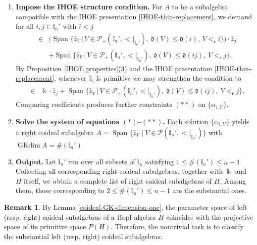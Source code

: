 \documentclass{article}
\theoremstyle{plain}
\theoremstyle{definition}
\newtheorem{remark}[thm]{Remark}
\numberwithin{equation}{section}
\DeclareMathOperator{\Span}{Span}
\DeclareMathOperator{\GKdim}{GKdim}
\newcommand{\PP}{\mathcal{P}}
\newcommand{\II}{\mathbb{I}}
\newcommand{\dd}{\mathfrak{d}}
\newcommand{\rr}{\mathfrak{r}}
\begin{document}
\begin{enumerate}
		\item[4.] \textbf{Impose the IHOE structure condition.}
		For $A$ to be a subalgebra compatible with the IHOE presentation \eqref{IHOE-thin-replacement}, we demand for all $i,j\in\II_{n}'$ with $i< j$
		\begin{eqnarray*}
			[\hat z_{j},\hat z_{i}] & \in & \bigl( \Span\bigl\{\hat z_{V}  \,\big|\, V \in \PP_{+}(\II_{n}',{<}|_{\II_{n}'}),~ \dd(V)\le \dd(i), ~ V<_{\rr }i\bigr\} \bigr) \cdot \hat z_{j}  \\
			&& + \Span\bigl\{\hat z_{V}\,\big|\, V \in \PP_{+}(\II_{n}',{<}|_{\II_{n}'}),~ \dd(V)\le \dd(ij), ~ V<_{\rr }j\bigr\}.
		\end{eqnarray*}
		By Proposition \ref{IHOE properties}(3) and the IHOE presentation \eqref{IHOE-thin-replacement}, whenever $\hat z_{i}$ is primitive we may strengthen the condition to
		\begin{eqnarray*}
			[\hat z_{j},\hat z_{i}] & \in &  \Bbbk \cdot \hat z_{j}  +  \Span\bigl\{\hat z_{V}\,\big|\, V \in \PP_{+}(\II_{n}',{<}|_{\II_{n}'}),~ \dd(V)\le \dd(ij), ~ V<_{\rr }j\bigr\}.
		\end{eqnarray*}
		Comparing coefficients produces further constraints $(\ast\ast)$ on $\{\alpha_{i,U}\}$.
		
		\item[5.] \textbf{Solve the system of equations $(\ast)$--$(\ast\ast)$.}
		Each solution $\{\alpha_{i,U}\}$ yields a right coideal subalgebra $
		A=\operatorname{Span}\{\hat{z}_{V}\mid V\in \PP(\II_{n}', {<}|_{\II_{n}'})\}$ with $\GKdim A= \#(\II_{n}')$
		
		\item[6.] \textbf{Output.}
		Let $\II_{n}'$ run over all subsets of $\II_{n}$ satisfying $1\leq \#(\II_{n}') \leq n-1$. Collecting all corresponding right coideal subalgebras, together with $\Bbbk$ and $H$ itself, we obtain a complete list of right coideal subalgebras of $H$. Among them, those corresponding to $2\leq \#(\II_{n}') \leq n-1$ are the substantial ones. 
	\end{enumerate}
	
	\begin{remark}
		By Lemma \ref{coideal-GK-dimension-one}, the parameter space of left (resp. right) coideal subalgebras of a Hopf algebra $H$ coincides with the projective space of its primitive space $P(H)$. Therefore, the nontrivial task is to classify the substantial  left (resp. right) coideal subalgebras.
	\end{remark}
	
\end{document}

